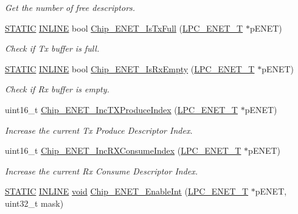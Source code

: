 \begin{DoxyCompactItemize}
\begin{DoxyCompactList}\small\item\em Get the number of free descriptors. \end{DoxyCompactList}\item 
\hyperlink{group__LPC__Types__Public__Macros_ga10b2d890d871e1489bb02b7e70d9bdfb}{S\-T\-A\-T\-I\-C} \hyperlink{group__LPC__Types__Public__Types_ga2eb6f9e0395b47b8d5e3eeae4fe0c116}{I\-N\-L\-I\-N\-E} bool \hyperlink{group__ENET__17XX__40XX_ga593f01cc1a9e665c8c3293c0599b254c}{Chip\-\_\-\-E\-N\-E\-T\-\_\-\-Is\-Tx\-Full} (\hyperlink{structLPC__ENET__T}{L\-P\-C\-\_\-\-E\-N\-E\-T\-\_\-\-T} $\ast$p\-E\-N\-E\-T)
\begin{DoxyCompactList}\small\item\em Check if Tx buffer is full. \end{DoxyCompactList}\item 
\hyperlink{group__LPC__Types__Public__Macros_ga10b2d890d871e1489bb02b7e70d9bdfb}{S\-T\-A\-T\-I\-C} \hyperlink{group__LPC__Types__Public__Types_ga2eb6f9e0395b47b8d5e3eeae4fe0c116}{I\-N\-L\-I\-N\-E} bool \hyperlink{group__ENET__17XX__40XX_ga19412cfa444b976f9ec13554da17d210}{Chip\-\_\-\-E\-N\-E\-T\-\_\-\-Is\-Rx\-Empty} (\hyperlink{structLPC__ENET__T}{L\-P\-C\-\_\-\-E\-N\-E\-T\-\_\-\-T} $\ast$p\-E\-N\-E\-T)
\begin{DoxyCompactList}\small\item\em Check if Rx buffer is empty. \end{DoxyCompactList}\item 
uint16\-\_\-t \hyperlink{group__ENET__17XX__40XX_ga9a1d6a9086bfbca3c856ad2b3b90546c}{Chip\-\_\-\-E\-N\-E\-T\-\_\-\-Inc\-T\-X\-Produce\-Index} (\hyperlink{structLPC__ENET__T}{L\-P\-C\-\_\-\-E\-N\-E\-T\-\_\-\-T} $\ast$p\-E\-N\-E\-T)
\begin{DoxyCompactList}\small\item\em Increase the current Tx Produce Descriptor Index. \end{DoxyCompactList}\item 
uint16\-\_\-t \hyperlink{group__ENET__17XX__40XX_ga4246666fbc4e9be17c45e6837a0e5dca}{Chip\-\_\-\-E\-N\-E\-T\-\_\-\-Inc\-R\-X\-Consume\-Index} (\hyperlink{structLPC__ENET__T}{L\-P\-C\-\_\-\-E\-N\-E\-T\-\_\-\-T} $\ast$p\-E\-N\-E\-T)
\begin{DoxyCompactList}\small\item\em Increase the current Rx Consume Descriptor Index. \end{DoxyCompactList}\item 
\hyperlink{group__LPC__Types__Public__Macros_ga10b2d890d871e1489bb02b7e70d9bdfb}{S\-T\-A\-T\-I\-C} \hyperlink{group__LPC__Types__Public__Types_ga2eb6f9e0395b47b8d5e3eeae4fe0c116}{I\-N\-L\-I\-N\-E} \hyperlink{Paradigm_2Tern__EE_2small_2portmacro_8h_a14d32f8130d3c0b212cfc751730b5b49}{void} \hyperlink{group__ENET__17XX__40XX_gac0afbb3c822a9e581416fd500b922313}{Chip\-\_\-\-E\-N\-E\-T\-\_\-\-Enable\-Int} (\hyperlink{structLPC__ENET__T}{L\-P\-C\-\_\-\-E\-N\-E\-T\-\_\-\-T} $\ast$p\-E\-N\-E\-T, uint32\-\_\-t mask)

\end{DoxyCompactItemize}
